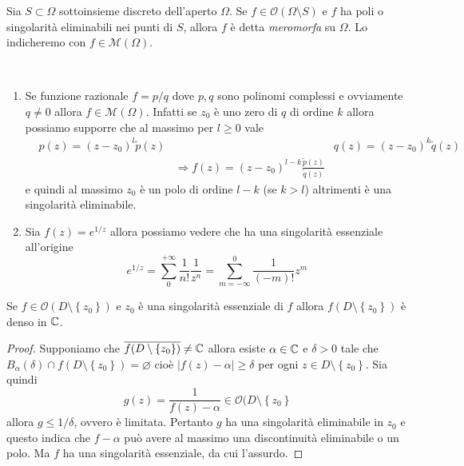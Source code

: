 \begin{definition}
  Sia $S \subset \Omega$ sottoinsieme discreto dell'aperto $\Omega$. Se $f \in
  \mathcal{O}(\Omega \setminus S)$ e $f$ ha poli o singolarità eliminabili nei
  punti di $S$, allora $f$ è detta \emph{meromorfa} su $\Omega$. Lo indicheremo
  con $f \in \mathcal{M}(\Omega)$.
  \label{def:meromorfismo}
\end{definition}

\begin{example}\
  \begin{enumerate}
    \item Se funzione razionale $f= p / q$ dove $p,q$ sono polinomi complessi
      e ovviamente $q \neq 0$ allora $f \in \mathcal{M}(\Omega)$. Infatti se
      $z_0$ è uno zero di $q$ di ordine $k$ allora possiamo supporre che al
      massimo per $l \ge 0$ vale 
      \begin{align*}
        & p(z) = (z-z_0)^l \tilde{p}(z) &  & q(z)  = (z-z_0)^k \tilde{q}(z)  \\
        & & \Longrightarrow f(z)  = (z-z_0)^{l-k}
        \frac{\tilde{p}(z)}{\tilde{q}(z)} 
      \end{align*}
      e quindi al massimo $z_0$ è un polo di ordine $l-k$ (se $k > l$)
      altrimenti è una singolarità eliminabile. 
    \item Sia $f(z) = e^{1/z}$ allora possiamo vedere che ha una singolarità
      essenziale all'origine
      \begin{equation*}
        e^{1/z} = \sum_{0}^{+\infty} \frac{1}{n!}\frac{1}{z^n} = \sum_{m
        = -\infty}^{0} \frac{1}{(-m)!} z^m 
      \end{equation*}
  \end{enumerate}
\end{example}

\begin{theorem}
    Se $f \in \mathcal{O}(D \setminus \left\{z_0  \right\})$ e $z_0$ è una
    singolarità essenziale di $f$ allora $f(D \setminus \left\{ z_0 \right\})$
    è denso in $\mathbb{C}$.
  \label{thr:casorati_weierstrass}
\end{theorem}
\begin{proof}
  Supponiamo che $\overline{f(D \setminus \left\{ z_0 \right\})} \neq \mathbb{C}$ allora
  esiste $\alpha \in \mathbb{C}$ e $\delta > 0$ tale che $B_{\alpha}(\delta) \cap f(D
  \setminus \left\{ z_0 \right\}) = \varnothing$ cioè $|f(z) - \alpha| \ge
  \delta$ per ogni $z \in D \setminus \left\{ z_0 \right\}$. Sia quindi
  \begin{equation*}
    g(z) = \frac{1}{f(z) - \alpha} \in \mathcal{O}(D \setminus \left\{ z_0
      \right\}
  \end{equation*}
  allora $g \le 1/\delta$, ovvero è limitata. Pertanto $g$ ha una singolarità
  eliminabile in $z_0$ e questo indica che $f - \alpha$ può avere al massimo una
  discontinuità eliminabile o un polo. Ma $f$ ha una singolarità essenziale, da
  cui l'assurdo.
\end{proof}


